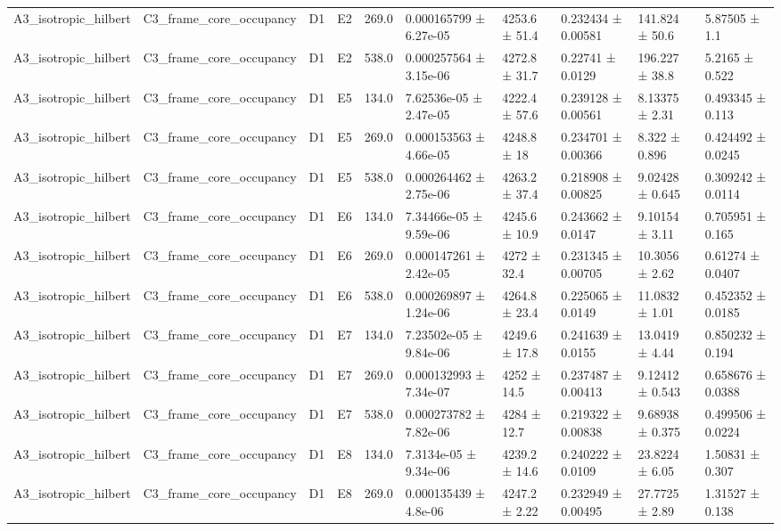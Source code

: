 \begin{table}
\begin{tabular}{llllllllll}
A3\_isotropic\_hilbert & C3\_frame\_core\_occupancy & D1 & E2 & 269.0 & 0.000165799 ± 6.27e-05 & 4253.6 ± 51.4 & 0.232434 ± 0.00581 & 141.824 ± 50.6 & 5.87505 ± 1.1 \\
A3\_isotropic\_hilbert & C3\_frame\_core\_occupancy & D1 & E2 & 538.0 & 0.000257564 ± 3.15e-06 & 4272.8 ± 31.7 & 0.22741 ± 0.0129 & 196.227 ± 38.8 & 5.2165 ± 0.522 \\
A3\_isotropic\_hilbert & C3\_frame\_core\_occupancy & D1 & E5 & 134.0 & 7.62536e-05 ± 2.47e-05 & 4222.4 ± 57.6 & 0.239128 ± 0.00561 & 8.13375 ± 2.31 & 0.493345 ± 0.113 \\
A3\_isotropic\_hilbert & C3\_frame\_core\_occupancy & D1 & E5 & 269.0 & 0.000153563 ± 4.66e-05 & 4248.8 ± 18 & 0.234701 ± 0.00366 & 8.322 ± 0.896 & 0.424492 ± 0.0245 \\
A3\_isotropic\_hilbert & C3\_frame\_core\_occupancy & D1 & E5 & 538.0 & 0.000264462 ± 2.75e-06 & 4263.2 ± 37.4 & 0.218908 ± 0.00825 & 9.02428 ± 0.645 & 0.309242 ± 0.0114 \\
A3\_isotropic\_hilbert & C3\_frame\_core\_occupancy & D1 & E6 & 134.0 & 7.34466e-05 ± 9.59e-06 & 4245.6 ± 10.9 & 0.243662 ± 0.0147 & 9.10154 ± 3.11 & 0.705951 ± 0.165 \\
A3\_isotropic\_hilbert & C3\_frame\_core\_occupancy & D1 & E6 & 269.0 & 0.000147261 ± 2.42e-05 & 4272 ± 32.4 & 0.231345 ± 0.00705 & 10.3056 ± 2.62 & 0.61274 ± 0.0407 \\
A3\_isotropic\_hilbert & C3\_frame\_core\_occupancy & D1 & E6 & 538.0 & 0.000269897 ± 1.24e-06 & 4264.8 ± 23.4 & 0.225065 ± 0.0149 & 11.0832 ± 1.01 & 0.452352 ± 0.0185 \\
A3\_isotropic\_hilbert & C3\_frame\_core\_occupancy & D1 & E7 & 134.0 & 7.23502e-05 ± 9.84e-06 & 4249.6 ± 17.8 & 0.241639 ± 0.0155 & 13.0419 ± 4.44 & 0.850232 ± 0.194 \\
A3\_isotropic\_hilbert & C3\_frame\_core\_occupancy & D1 & E7 & 269.0 & 0.000132993 ± 7.34e-07 & 4252 ± 14.5 & 0.237487 ± 0.00413 & 9.12412 ± 0.543 & 0.658676 ± 0.0388 \\
A3\_isotropic\_hilbert & C3\_frame\_core\_occupancy & D1 & E7 & 538.0 & 0.000273782 ± 7.82e-06 & 4284 ± 12.7 & 0.219322 ± 0.00838 & 9.68938 ± 0.375 & 0.499506 ± 0.0224 \\
A3\_isotropic\_hilbert & C3\_frame\_core\_occupancy & D1 & E8 & 134.0 & 7.3134e-05 ± 9.34e-06 & 4239.2 ± 14.6 & 0.240222 ± 0.0109 & 23.8224 ± 6.05 & 1.50831 ± 0.307 \\
A3\_isotropic\_hilbert & C3\_frame\_core\_occupancy & D1 & E8 & 269.0 & 0.000135439 ± 4.8e-06 & 4247.2 ± 2.22 & 0.232949 ± 0.00495 & 27.7725 ± 2.89 & 1.31527 ± 0.138 \\

\end{tabular}
\end{table}
